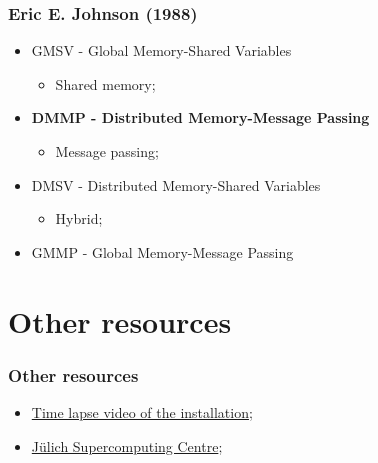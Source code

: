 \documentclass{beamer}
\begin{document}
\begin{frame}
  \frametitle{Eric E. Johnson (1988)}
  \begin{itemize}
    \item GMSV - Global Memory-Shared Variables
          \begin{itemize}
            \item Shared memory;
          \end{itemize}
    \item \textbf{DMMP - Distributed Memory-Message Passing}
          \begin{itemize}
            \item Message passing;
          \end{itemize}
    \item DMSV - Distributed Memory-Shared Variables
          \begin{itemize}
            \item Hybrid;
          \end{itemize}
    \item GMMP - Global Memory-Message Passing
  \end{itemize}
\end{frame}


\section{Other resources}

\begin{frame}
  \frametitle{Other resources}
  \begin{itemize}
    \item \href{https://www.youtube.com/watch?v=7h6mYU2HDTA}{Time lapse video of the installation};
    \item \href{https://www.fz-juelich.de/ias/jsc/EN/Home/home_node.html}{Jülich Supercomputing Centre};
  \end{itemize}
\end{frame}
\end{document}
